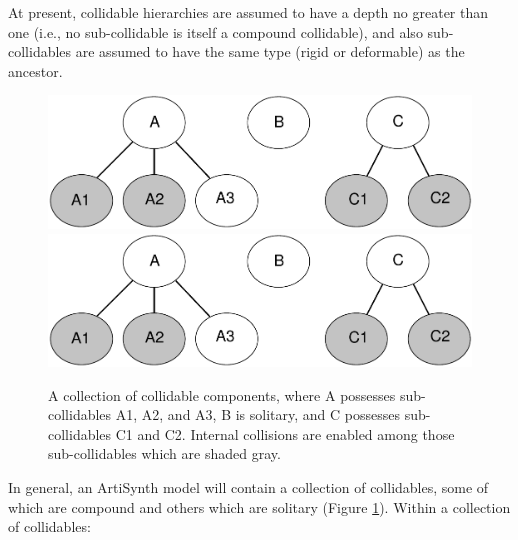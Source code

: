 \begin{sideblock}
At present, collidable hierarchies are assumed to have a depth no
greater than one (i.e., no sub-collidable is itself a compound
collidable), and also sub-collidables are assumed to have the same
type (rigid or deformable) as the ancestor.
\end{sideblock}

\begin{figure}[ht]
\begin{center}
 \iflatexml
   \includegraphics[width=5in]{images/CollidableGroups}
 \else
   \includegraphics[width=5in]{images/CollidableGroups}
 \fi
\end{center}
\caption{A collection of collidable components, where A possesses
sub-collidables A1, A2, and A3, B is solitary, and C possesses
sub-collidables C1 and C2. Internal collisions are enabled among those
sub-collidables which are shaded gray.}
\label{CollidableGroups:fig}
\end{figure}

In general, an ArtiSynth model will contain a collection of
collidables, some of which are compound and others which are
solitary (Figure \ref{CollidableGroups:fig}).  Within a collection of
collidables:

